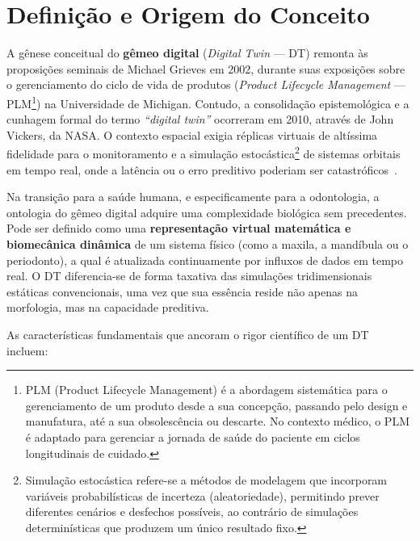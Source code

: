 \section{Definição e Origem do Conceito}

A gênese conceitual do \textbf{gêmeo digital} (\textit{Digital Twin} --- DT) remonta às proposições seminais de Michael Grieves em 2002, durante suas exposições sobre o gerenciamento do ciclo de vida de produtos (\textit{Product Lifecycle Management} --- PLM\footnote{PLM (Product Lifecycle Management) é a abordagem sistemática para o gerenciamento de um produto desde a sua concepção, passando pelo design e manufatura, até a sua obsolescência ou descarte. No contexto médico, o PLM é adaptado para gerenciar a jornada de saúde do paciente em ciclos longitudinais de cuidado.}) na Universidade de Michigan. Contudo, a consolidação epistemológica e a cunhagem formal do termo \textit{``digital twin''} ocorreram em 2010, através de John Vickers, da NASA. O contexto espacial exigia réplicas virtuais de altíssima fidelidade para o monitoramento e a simulação estocástica\footnote{Simulação estocástica refere-se a métodos de modelagem que incorporam variáveis probabilísticas de incerteza (aleatoriedade), permitindo prever diferentes cenários e desfechos possíveis, ao contrário de simulações determinísticas que produzem um único resultado fixo.} de sistemas orbitais em tempo real, onde a latência ou o erro preditivo poderiam ser catastróficos~\cite{katsoulakis2024digital}.

Na transição para a saúde humana, e especificamente para a odontologia, a ontologia do gêmeo digital adquire uma complexidade biológica sem precedentes. Pode ser definido como uma \textbf{representação virtual matemática e biomecânica dinâmica} de um sistema físico (como a maxila, a mandíbula ou o periodonto), a qual é atualizada continuamente por influxos de dados em tempo real. O DT diferencia-se de forma taxativa das simulações tridimensionais estáticas convencionais, uma vez que sua essência reside não apenas na morfologia, mas na capacidade preditiva.


As características fundamentais que ancoram o rigor científico de um DT incluem:

